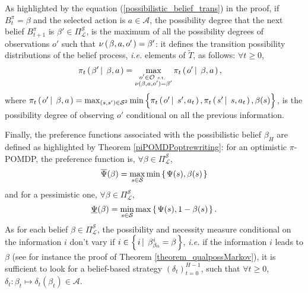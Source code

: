 As highlighted by the equation (\ref{possibilistic_belief_trans}) in the proof, if $B^{\pi}_t=\beta$
and the selected action is $a \in \mathcal{A}$, 
the possibility degree that the next belief $B^{\pi}_{t+1}$ is $\beta' \in \Pi^{\mathcal{S}}_{\mathcal{L}}$, 
is the maximum of all the possibility degrees of observations $o'$
such that $\nu \left( \left. \beta,a,o' \right. \right)=\beta'$: 
it defines the transition possibility distributions of the belief process,
\textit{i.e.} elements of $\tilde{T}$, as follows: $\forall t \geqslant 0$,
\begin{align}
\label{transition_possibilistic_belief} \pi_t \left( \left.  \beta' \, \right| \left. \, \beta,a \right. \right) &= \max_{ \substack{ o' \in \mathcal{O} \mbox{ \tiny s.t. } \\ \nu(\beta,a,o') = \beta'} } \pi_t \left( \left.  o' \, \right| \left. \, \beta, a  \right. \right),
\end{align}
where $\pi_t \left( \left.  o' \, \right| \left. \, \beta, a  \right. \right) = \max_{(s,s') \in \mathcal{S}^2} \min \Big\{ \pi_t \left( \left.  o' \, \right| \left. \, s', a_t  \right. \right), \pi_t \left( \left.  s' \, \right| \left. \, s, a_t  \right. \right), \beta(s) \Big\}$,
is the possibility degree of observing $o'$ conditional on all the previous information.

Finally, the preference functions associated with the possibilistic belief $\beta_H$ are defined as
highlighted by Theorem \ref{piPOMDPoptrewriting}: for an optimistic $\pi$-POMDP, the preference function is, $\forall \beta \in \Pi^{\mathcal{S}}_{\mathcal{L}}$,
\begin{equation}
\label{opt_preference}
 \overline{\Psi}(\beta) = \max_{s\in\mathcal{S}} \min \left\{ \left.  \Psi(s), \beta(s)  \right. \right\} 
\end{equation}
and for a pessimistic one, $\forall \beta \in \Pi^{\mathcal{S}}_{\mathcal{L}}$,
\begin{equation}
\label{pess_preference}
 \underline{\Psi}(\beta) = \min_{s\in \mathcal{S}} \max \left\{ \left.  \Psi(s), 1 - \beta(s)  \right. \right\}.
\end{equation}
As for each belief $\beta \in \Pi^{\mathcal{S}}_{\mathcal{L}}$, 
the possibility and necessity measure conditional on the information $i$ 
don't vary if $i \in \left\{ \left.  i \, \right| \left. \, \beta_{\beta_0}^{i} = \beta  \right. \right\}$,
\textit{i.e.} if the information $i$ leads to $\beta$ (see for instance the proof of Theorem \ref{theorem_qualpossMarkov}),
it is sufficient to look for a belief-based strategy $(\delta_t)_{t=0}^{H-1}$,
such that $\forall t \geqslant 0$, $\delta_t: \beta_t \mapsto \delta_t(\beta_t) \in \mathcal{A}$.

